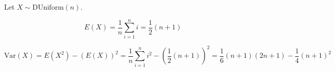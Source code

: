Let $X \sim \text{DUniform}(n)$.

$$E(X) = \frac{1}{n}\sum_{i=1}^{n}i = \frac{1}{2}(n+1)$$

$$\text{Var}(X) = E(X^{2}) - (E(X))^{2} = \frac{1}{n}\sum_{i=1}^{n}i^{2} - (
\frac{1}{2}(n+1))^{2} = \frac{1}{6}(n+1)(2n+1) - \frac{1}{4}(n+1)^{2}$$